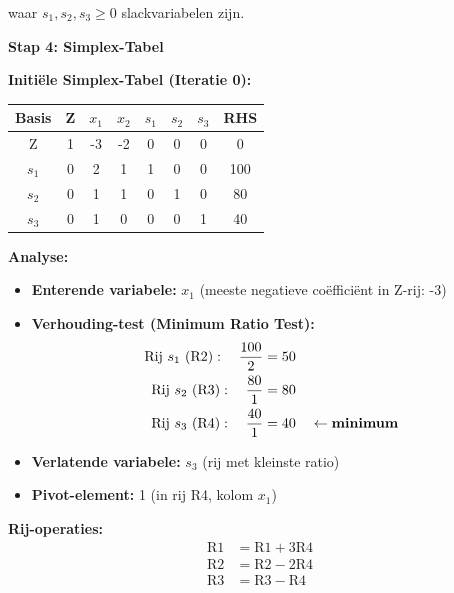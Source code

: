 \documentclass[a4paper,11pt]{article}
\begin{document}
\begin{oefenblok}[title=Lineair Programmeren — De Ambachtelijke Werkplaats]
waar $s_1, s_2, s_3 \geq 0$ slackvariabelen zijn.

\textbf{Stap 4: Simplex-Tabel}

\textbf{Initiële Simplex-Tabel (Iteratie 0):}

\vspace{0.3cm}

\begin{center}
\begin{tabular}{|c|c|c|c|c|c|c|c|}
\hline
\textbf{Basis} & \textbf{Z} & \textbf{$x_1$} & \textbf{$x_2$} & \textbf{$s_1$} & \textbf{$s_2$} & \textbf{$s_3$} & \textbf{RHS} \\
\hline
Z & 1 & -3 & -2 & 0 & 0 & 0 & 0 \\
\hline
$s_1$ & 0 & 2 & 1 & 1 & 0 & 0 & 100 \\
\hline
$s_2$ & 0 & 1 & 1 & 0 & 1 & 0 & 80 \\
\hline
$s_3$ & 0 & 1 & 0 & 0 & 0 & 1 & 40 \\
\hline
\end{tabular}
\end{center}
\FloatBarrier

\textbf{Analyse:}
\begin{itemize}
    \item \textbf{Enterende variabele:} $x_1$ (meeste negatieve coëfficiënt in Z-rij: -3)
    \item \textbf{Verhouding-test (Minimum Ratio Test):}
    \begin{align*}
    \text{Rij } s_1 \text{ (R2)}: \quad \frac{100}{2} &= 50 \\
    \text{Rij } s_2 \text{ (R3)}: \quad \frac{80}{1} &= 80 \\
    \text{Rij } s_3 \text{ (R4)}: \quad \frac{40}{1} &= 40 \quad \leftarrow \text{\textbf{minimum}}
    \end{align*}
    \item \textbf{Verlatende variabele:} $s_3$ (rij met kleinste ratio)
    \item \textbf{Pivot-element:} 1 (in rij R4, kolom $x_1$)
\end{itemize}

\textbf{Rij-operaties:}
\begin{align*}
\text{R1} &= \text{R1} + 3 \text{R4} \\
\text{R2} &= \text{R2} - 2 \text{R4} \\
\text{R3} &= \text{R3} - \text{R4}
\end{align*}

\vspace{0.3cm}


\end{oefenblok}
\end{document}
